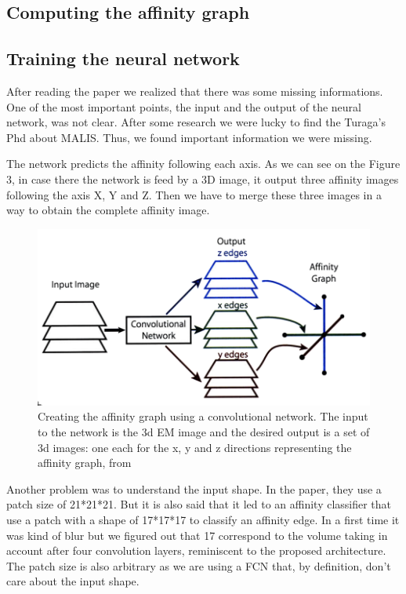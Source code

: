 \subsection{Computing the affinity graph}
\subsection{Training the neural network}

After reading the paper we realized that there was some missing informations. One of the most important points, the input and the output of the neural network, was not clear. After some research we were lucky to find the Turaga’s Phd about MALIS. Thus, we found important information we were missing.

The network predicts the affinity following each axis. As we can see on the Figure 3, in case there the network is feed by a 3D image, it output three affinity images following the axis X, Y and Z. Then we have to merge these three images in a way to obtain the complete affinity image.

\begin{figure}[!htbp]
	\centering
	\includegraphics[width=0.8\linewidth]{./images/nn_output.png}
	\caption{Creating the affinity graph using a convolutional network. The input to the network is the 3d EM image and the desired output is a set of 3d images: one each for the x, y and z directions representing the affinity graph, from~\cite{turaga_learning_2010}}%
	\label{fig:nn_output}
\end{figure}

Another problem was to understand the input shape. In the paper, they use a patch size of 21*21*21. But it is also said that it led to an affinity classifier that use a patch with a shape of 17*17*17 to classify an affinity edge. In a first time it was kind of blur but we figured out that 17 correspond to the volume taking in account after four convolution layers, reminiscent to the proposed architecture. The patch size is also arbitrary as we are using a FCN that, by definition, don’t care about the input shape.
\newpage

